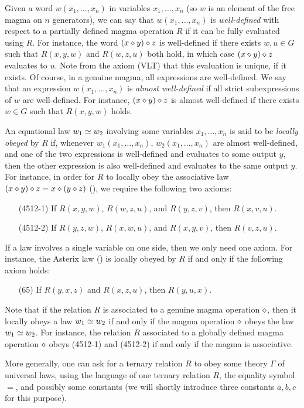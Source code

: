 Given a word $w(x_1,\dots,x_n)$ in variables $x_1,\dots,x_n$ (so $w$ is an element of the free magma on $n$ generators), we can say that $w(x_1,\dots,x_n)$ is \emph{well-defined} with respect to a partially defined magma operation $R$ if it can be fully evaluated using $R$.  For instance, the word $(x \diamond y) \diamond z$ is well-defined if there exists $w,u \in G$ such that $R(x,y,w)$ and $R(w,z,u)$ both hold, in which case $(x \diamond y) \diamond z$ evaluates to $u$.  Note from the axiom (VLT) that this evaluation is unique, if it exists.  Of course, in a genuine magma, all expressions are well-defined.  We say that an expression $w(x_1,\dots,x_n)$ is \emph{almost well-defined} if all strict subexpressions of $w$ are well-defined.  For instance, $(x \diamond y) \diamond z$ is almost well-defined if there exists $w \in G$ such that $R(x,y,w)$ holds.

An equational law $w_1 \simeq w_2$ involving some variables $x_1,\dots,x_n$ is said to be \emph{locally obeyed} by $R$ if,  whenever $w_1(x_1,\dots,x_n)$, $w_2(x_1,\dots,x_n)$ are almost well-defined, and one of the two expressions is well-defined and evaluates to some output $y$, then the other expression is also well-defined and evaluates to the same output $y$.  For instance, in order for $R$ to locally obey the associative law $(x \diamond y) \diamond z = x \diamond (y \diamond z)$ (), we require the following two axioms:
\begin{itemize}
  \item[(4512-1)] If $R(x,y,w)$, $R(w,z,u)$, and $R(y,z,v)$, then $R(x,v,u)$.
  \item[(4512-2)] If $R(y,z,w)$, $R(x,w,u)$, and $R(x,y,v)$, then $R(v,z,u)$.
\end{itemize}
If a law involves a single variable on one side, then we only need one axiom.  For instance, the Asterix law () is locally obeyed by $R$ if and only if the following axiom holds:
\begin{itemize}
  \item[(65)] If $R(y,x,z)$ and $R(x,z,u)$, then $R(y,u,x)$.
\end{itemize}
Note that if the relation $R$ is associated to a genuine magma operation $\diamond$, then it locally obeys a law $w_1 \simeq w_2$ if and only if the magma operation $\diamond$ obeys the law $w_1 \simeq w_2$.  For instance, the relation $R$ associated to a globally defined magma operation $\diamond$ obeys (4512-1) and (4512-2) if and only if the magma is associative.

More generally, one can ask for a ternary relation $R$ to obey some theory $\Gamma$ of universal laws, using the language of one ternary relation $R$, the equality symbol $=$, and possibly some constants (we will shortly introduce three constants $a,b,c$ for this purpose).

